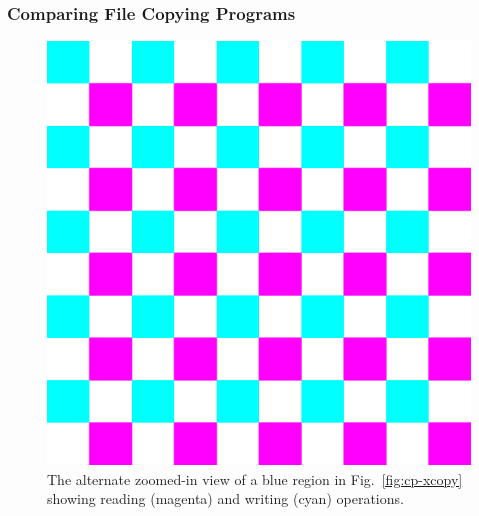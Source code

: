 \subsubsection{Comparing File Copying Programs}
\label{sec:cp}



\begin{figure}[htb]
\begin{center}
\includegraphics[width=0.10\columnwidth]{lviz/cp-zoom.png}
\caption{The alternate zoomed-in view of a blue region in
Fig.~\ref{fig:cp-xcopy} showing reading (magenta) and writing (cyan) operations.
}
\label{fig:cp-zoom}
\end{center}
\end{figure}

